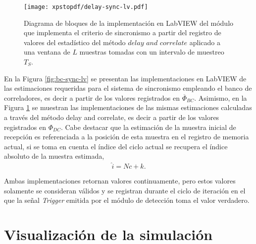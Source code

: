 \begin{figure}[t]
    \centering{}\texttt{[image: xpstopdf/delay-sync-lv.pdf]}
    \caption[Implementación en LabVIEW del criterio de sincronismo a partir del registro del estadístico del método \textit{delay and correlate}.]{Diagrama de bloques de la implementación en LabVIEW del módulo que implementa el criterio de sincronismo a partir del registro de valores del estadístico del método $\textit{delay and correlate}$ aplicado a una ventana de $L$ muestras tomadas con un intervalo de muestreo $T_S$.\label{fig:dc-sync-lv}}  
\end{figure}

En la Figura \ref{fig:bc-sync-lv} se presentan las implementaciones en LabVIEW de las estimaciones requeridas para el sistema de sincronismo empleando el banco de correladores, es decir a partir de los valores registrados en $\overline{\Phi}_{BC}$. Asimismo, en la Figura \ref{fig:dc-sync-lv} se muestran las implementaciones de las mismas estimaciones calculadas a través del método delay and correlate, es decir a partir de los valores registrados en $\Phi_{DC}$. Cabe destacar que la estimación de la muestra inicial de recepción es referenciada a la posición de esta muestra en el registro de memoria actual, si se toma en cuenta el índice del ciclo actual se recupera el índice absoluto de la muestra estimada,
\begin{equation}
    \widehat{i} = Nc+\widehat{k}.
\end{equation}

Ambas implementaciones retornan valores continuamente, pero estos valores solamente se consideran válidos y se registran durante el ciclo de iteración en el que la señal \textit{Trigger} emitida por el módulo de detección toma el valor verdadero.

\section{Visualización de la simulación}

